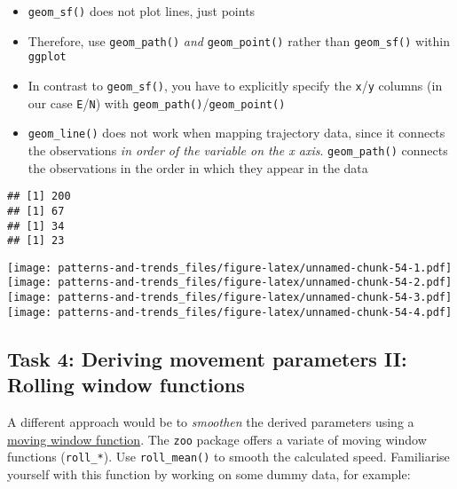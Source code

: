 \documentclass[
]{book}
\providecommand{\tightlist}{%
  \setlength{\itemsep}{0pt}\setlength{\parskip}{0pt}}
\begin{document}
\begin{itemize}
\tightlist
\item
  \texttt{geom\_sf()} does not plot lines, just points
\item
  Therefore, use \texttt{geom\_path()} \emph{and} \texttt{geom\_point()} rather than \texttt{geom\_sf()} within \texttt{ggplot}
\item
  In contrast to \texttt{geom\_sf()}, you have to explicitly specify the \texttt{x}/\texttt{y} columns (in our case \texttt{E}/\texttt{N}) with \texttt{geom\_path()}/\texttt{geom\_point()}
\item
  \texttt{geom\_line()} does not work when mapping trajectory data, since it connects the observations \emph{in order of the variable on the x axis}. \texttt{geom\_path()} connects the observations in the order in which they appear in the data
\end{itemize}

\begin{verbatim}
## [1] 200
## [1] 67
## [1] 34
## [1] 23
\end{verbatim}

\texttt{[image: patterns-and-trends\_files/figure-latex/unnamed-chunk-54-1.pdf]} \texttt{[image: patterns-and-trends\_files/figure-latex/unnamed-chunk-54-2.pdf]} \texttt{[image: patterns-and-trends\_files/figure-latex/unnamed-chunk-54-3.pdf]} \texttt{[image: patterns-and-trends\_files/figure-latex/unnamed-chunk-54-4.pdf]}

\hypertarget{task-4-deriving-movement-parameters-ii-rolling-window-functions}{%
\subsection{Task 4: Deriving movement parameters II: Rolling window functions}\label{task-4-deriving-movement-parameters-ii-rolling-window-functions}}

A different approach would be to \emph{smoothen} the derived parameters using a \href{https://docs.wavefront.com/images/5sec_moving_window.png}{moving window function}. The \texttt{zoo} package offers a variate of moving window functions (\texttt{roll\_*}). Use \texttt{roll\_mean()} to smooth the calculated speed. Familiarise yourself with this function by working on some dummy data, for example:
\end{document}
